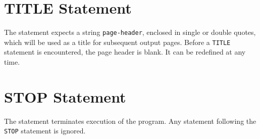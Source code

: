 \section{TITLE Statement}
\label{S-TITLE}
The  statement
expects a string {\tt page-header},
enclosed in single or double quotes,
which will be used as a title for subsequent output pages.
Before a {\tt TITLE} statement is encountered, the page header is blank.
It can be redefined at any time.
 
\section{STOP Statement}
\label{S-STOP}
The  statement
terminates execution of the program.
Any statement following the {\tt STOP} statement is ignored.
 
